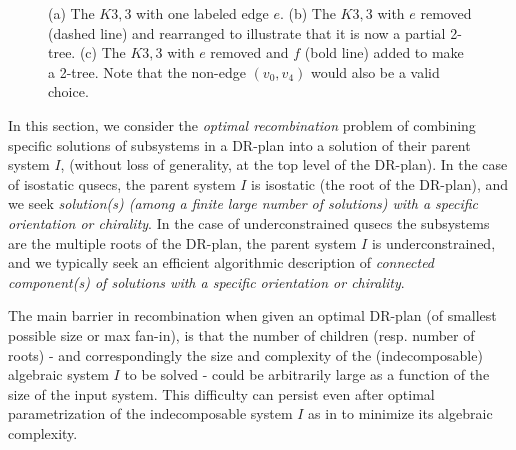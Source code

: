 \begin{figure*}\centering
\begin{subfigure}{.3\linewidth}\centering
    
    \caption{}
\end{subfigure}
\begin{subfigure}{.3\linewidth}\centering
    
    \caption{}
\end{subfigure}
\begin{subfigure}{.3\linewidth}\centering
    
    \caption{}
\end{subfigure}

\caption{(a) The $K3,3$ with one labeled edge $e$. (b) The $K3,3$ with $e$ removed (dashed line) and rearranged to illustrate that it is now a partial 2-tree. (c) The $K3,3$ with $e$ removed and $f$ (bold line) added to make a 2-tree. Note that the non-edge $(v_0,v_4)$ would also be a valid choice.}
\label{fig:omd_k33_example}
\end{figure*}


In this section, we consider the {\em optimal recombination}
problem of combining specific solutions of
subsystems in a DR-plan into a solution of their parent system $I$, (without
loss of generality, at the top level of the DR-plan). In the case of isostatic
qusecs, the parent system $I$ is isostatic (the root of the DR-plan), and we
seek  {\em solution(s) (among a finite large number of solutions)
with a specific orientation or chirality}.
In the case of underconstrained qusecs the subsystems are the multiple roots
of the DR-plan, the parent system $I$ is underconstrained, and we typically seek
an efficient algorithmic description of {\em connected component(s) of solutions with a specific orientation or
chirality}.

The main barrier in recombination when given an optimal DR-plan (of smallest possible
size or max fan-in),  is that the number of children (resp. number of
roots) - and correspondingly the  size and complexity of the (indecomposable) algebraic
system $I$ to be solved -
could be arbitrarily large as a function of the size of the input system.
This difficulty can persist even after optimal parametrization of the
indecomposable system $I$ as in \cite{XX}
to minimize its algebraic complexity.

